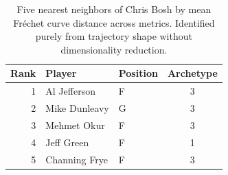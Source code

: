 \begin{table}[htbp]
  \centering\small
  \begin{tabular}{rllc}
    \toprule
    Rank & Player & Position & Archetype \\
    \midrule
    1 & Al Jefferson & F & 3 \\
    2 & Mike Dunleavy & G & 3 \\
    3 & Mehmet Okur & F & 3 \\
    4 & Jeff Green & F & 1 \\
    5 & Channing Frye & F & 3 \\
    \bottomrule
  \end{tabular}
  \caption{Five nearest neighbors of Chris Bosh by mean Fr\'{e}chet curve distance across metrics. Identified purely from trajectory shape without dimensionality reduction.}
  \label{tab:Chris_Bosh_frechet_curve_neighbors}
\end{table}

